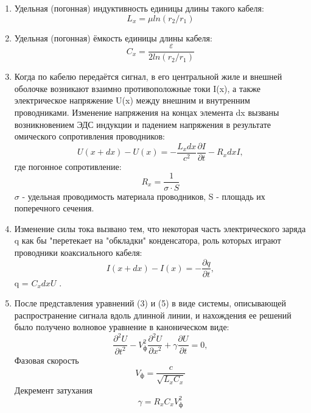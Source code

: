 \documentclass[a4paper,12pt]{article} %
\begin{document}
\begin{enumerate}
    \item Удельная (погонная) индуктивность единицы длины такого кабеля: 
    \begin{equation}
    L_x =  \mu ln(r_2/r_1)
\end{equation}
    \item Удельная (погонная) ёмкость единицы длины кабеля:
    \begin{equation}
    C_x = \frac{\varepsilon}{2ln(r_2/r_1)}
\end{equation}
    \item Когда по кабелю передаётся сигнал, в его центральной жиле и внешней оболочке возникают взаимно противоположные токи I(x), а также электрическое напряжение U(x) между внешним и внутренним проводниками. Изменение напряжения на концах элемента dx вызваны возникновением ЭДС индукции и
падением напряжения в результате омического сопротивления проводников: 
\begin{equation}
    U(x+dx) - U(x) = - \frac{L_x dx}{c^2} \frac{\partial I}{\partial t} - R_x dxI,
\end{equation} 
где погонное сопротивление:
\begin{equation}
    R_x = \frac{1}{\sigma \cdot S}
\end{equation} 
$\sigma$ - удельная проводимость материала проводников, S - площадь их поперечного
сечения.

\item Изменение силы тока вызвано тем, что некоторая часть электрического заряда q как бы "перетекает на "обкладки" конденсатора, роль которых играют проводники коаксиального
кабеля: 
\begin{equation}
    I(x+dx) - I(x) = - \frac{\partial q}{\partial t},
\end{equation} 
q = $C_x dx U$ .
\item После представления уравнений (3) и (5) в виде системы, описывающей распространение сигнала
вдоль длинной линии, и нахождения ее решений было получено волновое уравнение в каноническом виде:
\begin{equation}
   \frac{\partial^2 U}{\partial t^2} - V^2_\text{ф} \frac{\partial^2 U}{\partial x^2} + \gamma \frac{\partial U}{\partial t} = 0,
\end{equation} 
Фазовая скорость
\begin{equation}
   V_\text{ф} = \frac{c}{\sqrt{L_x C_x}}
\end{equation} 
Декремент затухания
\begin{equation}
   \gamma = R_x C_x V_\text{ф}^2
\end{equation}



\end{enumerate}
\end{document}
